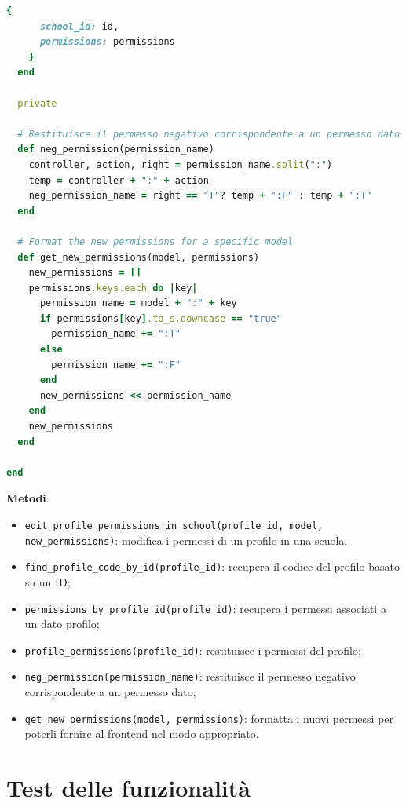 \documentclass[a4paper, 12pt]{book}
\begin{document}
\begin{lstlisting}[language=Ruby, caption={Modello School: gestione dei permessi}]
    {
      school_id: id,
      permissions: permissions
    }
  end

  private

  # Restituisce il permesso negativo corrispondente a un permesso dato
  def neg_permission(permission_name)
    controller, action, right = permission_name.split(":")
    temp = controller + ":" + action
    neg_permission_name = right == "T"? temp + ":F" : temp + ":T"
  end

  # Format the new permissions for a specific model
  def get_new_permissions(model, permissions)
    new_permissions = []
    permissions.keys.each do |key|
      permission_name = model + ":" + key
      if permissions[key].to_s.downcase == "true"
        permission_name += ":T"
      else
        permission_name += ":F"
      end
      new_permissions << permission_name
    end
    new_permissions
  end

end
\end{lstlisting}

\textbf{Metodi}:

\begin{itemize}
  \item \texttt{edit\_profile\_permissions\_in\_school(profile\_id, model, new\_permissions)}: modifica i permessi
        di un profilo in una scuola.
  \item \texttt{find\_profile\_code\_by\_id(profile\_id)}: recupera il codice del profilo basato su un ID;
  \item \texttt{permissions\_by\_profile\_id(profile\_id)}: recupera i permessi associati a un dato profilo;
  \item \texttt{profile\_permissions(profile\_id)}: restituisce i permessi del profilo;
  \item \texttt{neg\_permission(permission\_name)}: restituisce il permesso negativo corrispondente a un permesso dato;
  \item \texttt{get\_new\_permissions(model, permissions)}: formatta i nuovi permessi per poterli fornire al frontend
        nel modo appropriato.
\end{itemize}




\newpage

\chapter{Test delle funzionalità}
\end{document}
